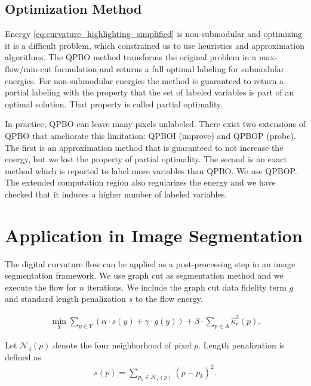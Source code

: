 \documentclass[runningheads]{llncs}
\begin{document}
\subsection{Optimization Method}\label{sec:optimization_method}

Energy \eqref{eq:curvature_highlighting_simplified} is non-submodular and optimizing it is a difficult problem, which
constrained us to use heuristics and approximation algorithms. The QPBO method \cite{kolmogorov07} transforms the
original problem in a max-flow/min-cut formulation and returns a full optimal labeling for submodular energies. For
non-submodular energies the method is guaranteed to return a partial labeling with the property that the set of labeled
variables is part of an optimal solution. That property is called partial optimality.

In practice, QPBO can leave many pixels unlabeled. There exist two extensions of QPBO that ameliorate this limitation: QPBOI
(improve) and QPBOP (probe). The first is an approximation method that is guaranteed to not increase the energy, but we
lost the property of partial optimality. The second is an exact method which is reported to label more variables than
QPBO. We use QPBOP. The extended computation region also regularizes the energy and we have checked that it induces a
higher number of labeled variables.
	
\section{Application in Image Segmentation}

The digital curvature flow can be applied as a post-processing step in an image segmentation framework. We use graph cut
\cite{boykov01} as segmentation method and we execute the flow for $n$ iterations. We include the graph cut data
fidelity term $g$ and standard length penalization $s$ to the flow energy.



\begin{align}			
	\min_{Y} \sum_{y \in Y}{\left( \alpha \cdot s(y) + \gamma \cdot g(y) \right)} + \beta \cdot \sum_{p \in A}{\hat{\kappa}_{r}^2(p)}.
	\label{eq:boundary-correction-energy}
\end{align}
	
	Let $\mathcal{N}_4(p)$ denote the four neighborhood of pixel $p$. Length penalization is defined as
	\begin{align*}
		s(p)=\sum_{p_k \in \mathcal{N}_4(p)}{ (p-p_k) }^2.
	\end{align*}
\end{document}

